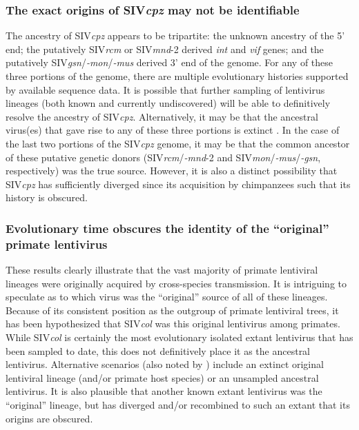 \subsubsection*{The exact origins of SIV\textit{cpz} may not be identifiable}
The ancestry of SIV\textit{cpz} appears to be tripartite: the unknown ancestry of the 5' end; the putatively SIV\textit{rcm} or SIV\textit{mnd}-2 derived \textit{int} and \textit{vif} genes; and the putatively SIV\textit{gsn}/\textit{-mon}/\textit{-mus} derived 3' end of the genome.
For any of these three portions of the genome, there are multiple evolutionary histories supported by available sequence data.
It is possible that further sampling of lentivirus lineages (both known and currently undiscovered) will be able to definitively resolve the ancestry of SIV\textit{cpz}.
Alternatively, it may be that the ancestral virus(es) that gave rise to any of these three portions is extinct \citep{apetrei2010pattern}.
In the case of the last two portions of the SIV\textit{cpz} genome, it may be that the common ancestor of these putative genetic donors (SIV\textit{rcm}/\textit{-mnd}-2 and SIV\textit{mon}/\textit{-mus}/\textit{-gsn}, respectively) was the true source.
However, it is also a distinct possibility that SIV\textit{cpz} has sufficiently diverged since its acquisition by chimpanzees such that its history is obscured.

\subsubsection*{Evolutionary time obscures the identity of the “original” primate lentivirus}
These results clearly illustrate that the vast majority of primate lentiviral lineages were originally acquired by cross-species transmission.
It is intriguing to speculate as to which virus was the “original” source of all of these lineages.
Because of its consistent position as the outgroup of primate lentiviral trees, it has been hypothesized \citep{compton2013convergence} that SIV\textit{col} was this original lentivirus among primates.
While SIV\textit{col} is certainly the most evolutionary isolated extant lentivirus that has been sampled to date, this does not definitively place it as the ancestral lentivirus.
Alternative scenarios (also noted by \citep{apetrei2010pattern,compton2013convergence}) include an extinct original lentiviral lineage (and/or primate host species) or an unsampled ancestral lentivirus.
It is also plausible that another known extant lentivirus was the “original” lineage, but has diverged and/or recombined to such an extant that its origins are obscured.

